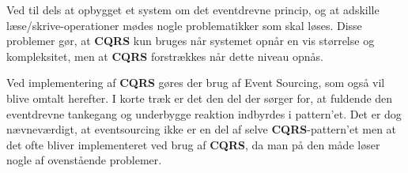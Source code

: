 Ved til dels at opbygget et system om det eventdrevne princip, og at adskille læse/skrive-operationer mødes nogle problematikker som skal løses. Disse problemer gør, at \textbf{CQRS} kun bruges når systemet opnår en vis størrelse og kompleksitet, men at \textbf{CQRS} forstrækkes når dette niveau opnås.\newline

Ved implementering af \textbf{CQRS} gøres der brug af Event Sourcing, som også vil blive omtalt herefter. I korte træk er det den del der sørger for, at fuldende den eventdrevne tankegang og underbygge reaktion indbyrdes i pattern'et.
Det er dog nævneværdigt, at eventsourcing ikke er en del af selve \textbf{CQRS}-pattern'et men at det ofte bliver implementeret ved brug af \textbf{CQRS}, da man på den måde løser nogle af ovenstående problemer.

